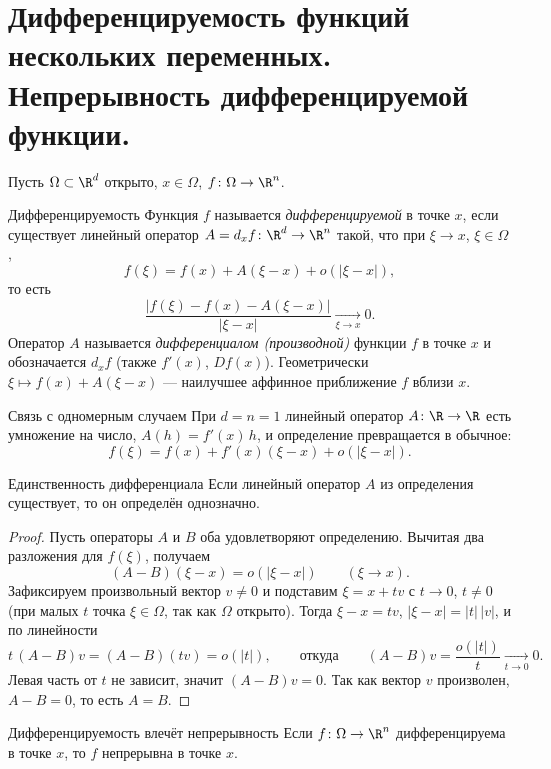 
\section{Дифференцируемость функций нескольких переменных. Непрерывность дифференцируемой функции.}

Пусть $\Omega\subset\R^d$ открыто, $x\in\Omega$, $f\colon\Omega\to\R^n$.

\begin{Definition}[required]{Дифференцируемость}{}
	Функция $f$ называется \emph{дифференцируемой} в точке $x$, если существует линейный оператор $A=d_xf\colon\R^d\to\R^n$ такой, что при $\xi\to x$, $\xi\in\Omega$,
	\[
	f(\xi)=f(x)+A(\xi-x)+o(|\xi-x|),
	\]
	то есть
	\[
	\frac{|f(\xi)-f(x)-A(\xi-x)|}{|\xi-x|}\xrightarrow[\xi\to x]{}0.
	\]
	Оператор $A$ называется \emph{дифференциалом (производной)} функции $f$ в точке $x$ и обозначается $d_xf$ (также $f'(x)$, $Df(x)$). Геометрически $\xi\mapsto f(x)+A(\xi-x)$ --- наилучшее аффинное приближение $f$ вблизи $x$.
\end{Definition}

\begin{Remark}{Связь с одномерным случаем}{}
	При $d=n=1$ линейный оператор $A\colon\R\to\R$ есть умножение на число, $A(h)=f'(x)\,h$, и определение превращается в обычное:
	\[
	f(\xi)=f(x)+f'(x)(\xi-x)+o(|\xi-x|).
	\]
\end{Remark}

\begin{Statement}{Единственность дифференциала}{}
	Если линейный оператор $A$ из определения существует, то он определён однозначно.
\end{Statement}

\begin{proof}
	Пусть операторы $A$ и $B$ оба удовлетворяют определению. Вычитая два разложения для $f(\xi)$, получаем
	\[
	(A-B)(\xi-x)=o(|\xi-x|)\qquad(\xi\to x).
	\]
	Зафиксируем произвольный вектор $v\ne0$ и подставим $\xi=x+tv$ с $t\to0$, $t\ne0$ (при малых $t$ точка $\xi\in\Omega$, так как $\Omega$ открыто). Тогда $\xi-x=tv$, $|\xi-x|=|t|\,|v|$, и по линейности
	\[
	t\,(A-B)v=(A-B)(tv)=o(|t|),
	\qquad\text{откуда}\qquad
	(A-B)v=\frac{o(|t|)}{t}\xrightarrow[t\to0]{}0.
	\]
	Левая часть от $t$ не зависит, значит $(A-B)v=0$. Так как вектор $v$ произволен, $A-B=0$, то есть $A=B$.
\end{proof}

\begin{Theorem}[required]{Дифференцируемость влечёт непрерывность}{}
	Если $f\colon\Omega\to\R^n$ дифференцируема в точке $x$, то $f$ непрерывна в точке $x$.
\end{Theorem}

